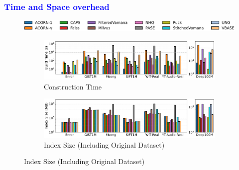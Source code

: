 \documentclass[sigconf, nonacm]{acmart}
\begin{document}
{	
	\subsubsection{\textcolor{blue}{Time and Space overhead}}
	\begin{figure}[t]
		\centering
		
		
		
		\hspace*{8pt} %
		\includegraphics[width=0.95\columnwidth]{figures/indexData/legend_only.pdf} %
		
		
		\begin{subfigure}{\columnwidth}
			\centering
			
			\includegraphics[width=0.99\linewidth]{figures/indexData/exp_7_build_time_comparison_query1.pdf}
			\caption{Construction Time}
			\label{fig:build_time_comparison_query1}
		\end{subfigure}
		
		
		
		\begin{subfigure}{\columnwidth}
			\centering
			
			\includegraphics[width=0.99\linewidth]{figures/indexData/exp_7_index_size_mb_comparison_query1.pdf}
			\caption{Index Size (Including Original Dataset)}
			\label{fig:index_size_mb_comparison_query1}
		\end{subfigure}
		
		
		

\end{figure}}
\end{document}
